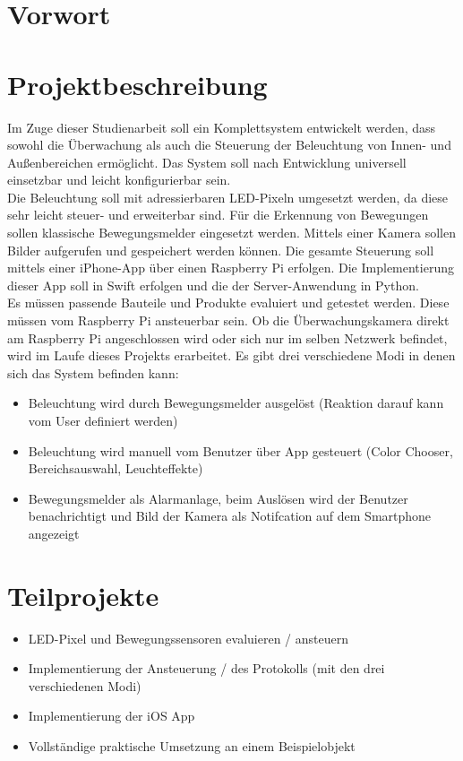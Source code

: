 \section{Vorwort}
\section{Projektbeschreibung}
Im Zuge dieser Studienarbeit soll ein Komplettsystem entwickelt werden, dass sowohl die Überwachung als auch die Steuerung der Beleuchtung von Innen- und Außenbereichen ermöglicht. Das System soll nach Entwicklung universell einsetzbar und leicht konfigurierbar sein.\\
Die Beleuchtung soll mit adressierbaren LED-Pixeln umgesetzt werden, da diese sehr leicht steuer- und erweiterbar sind. Für die Erkennung von Bewegungen sollen klassische Bewegungsmelder eingesetzt werden. Mittels einer Kamera sollen Bilder aufgerufen und gespeichert werden können. Die gesamte Steuerung soll mittels einer iPhone-App über einen Raspberry Pi erfolgen. Die Implementierung dieser App soll in Swift erfolgen und die der Server-Anwendung in Python.  \\
Es müssen passende Bauteile und Produkte evaluiert und getestet werden. Diese müssen vom Raspberry Pi ansteuerbar sein. Ob die Überwachungskamera direkt am Raspberry Pi angeschlossen wird oder sich nur im selben Netzwerk befindet, wird im Laufe dieses Projekts erarbeitet. 
Es gibt drei verschiedene Modi in denen sich das System befinden kann:
\begin{itemize}
\item Beleuchtung wird durch Bewegungsmelder ausgelöst (Reaktion darauf kann vom User definiert werden)
\item Beleuchtung wird manuell vom Benutzer über App gesteuert (Color Chooser, Bereichsauswahl, Leuchteffekte)
\item Bewegungsmelder als Alarmanlage, beim Auslösen wird der Benutzer benachrichtigt und Bild der Kamera als Notifcation auf dem Smartphone angezeigt
\end{itemize}

\section{Teilprojekte}
\begin{itemize}
\item LED-Pixel und Bewegungssensoren evaluieren / ansteuern
\item Implementierung der Ansteuerung / des Protokolls (mit den drei verschiedenen Modi)
\item Implementierung der iOS App
\item Vollständige praktische Umsetzung an einem Beispielobjekt
\end{itemize}
